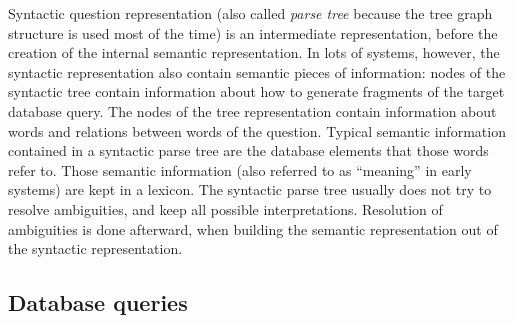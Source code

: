 \documentclass[10pt,journal,letterpaper,compsoc]{IEEEtran}
\newcommand\TODO[1]{{\textcolor{red}{TODO:#1}}}
\begin{document}
Syntactic question representation (also called {\it parse tree} because the
tree graph structure is used most of the time) is an intermediate
representation, before the creation of the internal semantic representation. In
lots of systems, however, the syntactic representation also contain semantic
pieces of information: nodes of the syntactic tree contain information about how
to generate fragments of the target database query. 
The nodes of the tree representation contain information about words and
relations between words of the question. 
Typical semantic information contained in a syntactic parse tree are the
database elements that those words refer to. 
Those semantic information (also referred to as ``meaning'' in early systems)
are kept in a lexicon. 
The syntactic parse tree usually does not try to resolve
ambiguities, and keep all possible interpretations. Resolution of ambiguities
is done afterward, when building the semantic representation out of the
syntactic representation.







\subsection{Database queries}
\label{sec:big-picture-semantic}
\end{document}
